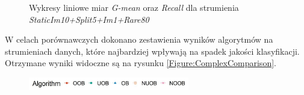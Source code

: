 \begin{figure}[h]
    \centering
    \qquad
    \caption{Wykresy liniowe miar \textit{G-mean} oraz \textit{Recall} dla strumienia \textit{StaticIm10+Split5+Im1+Rare80}}\label{Figure:ComlexScenario}
\end{figure}

\noindent W celach porównawczych dokonano zestawienia wyników algorytmów na strumieniach danych, które najbardziej wpływają na spadek jakości klasyfikacji. Otrzymane wyniki widoczne są na rysunku \ref{Figure:ComplexComparison}.

\begin{figure}[h]
    \centering
    \includegraphics[width=7cm]{figures/algorithms_legend.JPG}
\end{figure}

\vspace{-1.2cm}

